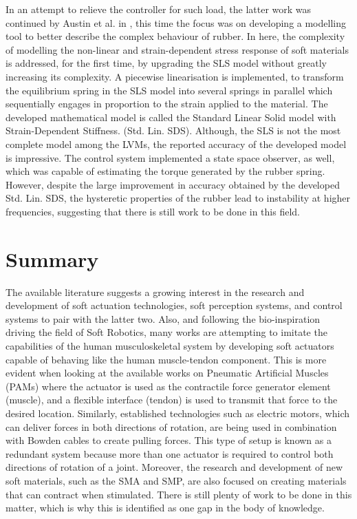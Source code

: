 In an attempt to relieve the controller for such load, the latter work was continued by Austin et al. in \cite{austin2015control}, this time the focus was on developing a modelling tool to better describe the complex behaviour of rubber. In here, the complexity of modelling the non-linear and strain-dependent stress response of soft materials is addressed, for the first time, by upgrading the SLS model without greatly increasing its complexity. A 
piecewise linearisation is implemented, to transform the equilibrium spring in the SLS model into several springs in parallel which sequentially engages in proportion to the strain applied to the material. The developed mathematical model is called the Standard Linear Solid model with Strain-Dependent Stiffness. (Std. Lin. SDS). Although, the SLS is not the most complete model among the LVMs, the reported accuracy of the developed model is impressive. The control system implemented a state space observer, as well, which was capable of estimating the torque generated by the rubber spring. However, despite the large improvement in accuracy obtained by the developed Std. Lin. SDS, the hysteretic properties of the rubber lead to instability at higher frequencies, suggesting that there is still work to be done in this field.

\section{Summary} \label{sec:gaps}

The available literature suggests a growing interest in the research and development of soft actuation technologies, soft perception systems, and control systems to pair with the latter two. Also, and following the bio-inspiration driving the field of Soft Robotics, many works are attempting to imitate the capabilities of the human musculoskeletal system by developing soft actuators capable of behaving like the human muscle-tendon component. This is more evident when looking at the available works on Pneumatic Artificial Muscles (PAMs) where the actuator is used as the contractile force generator element (muscle), and a flexible interface (tendon) is used to transmit that force to the desired location. Similarly, established technologies such as electric motors, which can deliver forces in both directions of rotation, are being used in combination with Bowden cables to create pulling forces. This type of setup is known as a redundant system because more than one actuator is required to control both directions of rotation of a joint. Moreover, the research and development of new soft materials, such as the SMA and SMP, are also focused on creating materials that can contract when stimulated. There is still plenty of work to be done in this matter, which is why this is identified as one gap in the body of knowledge.

